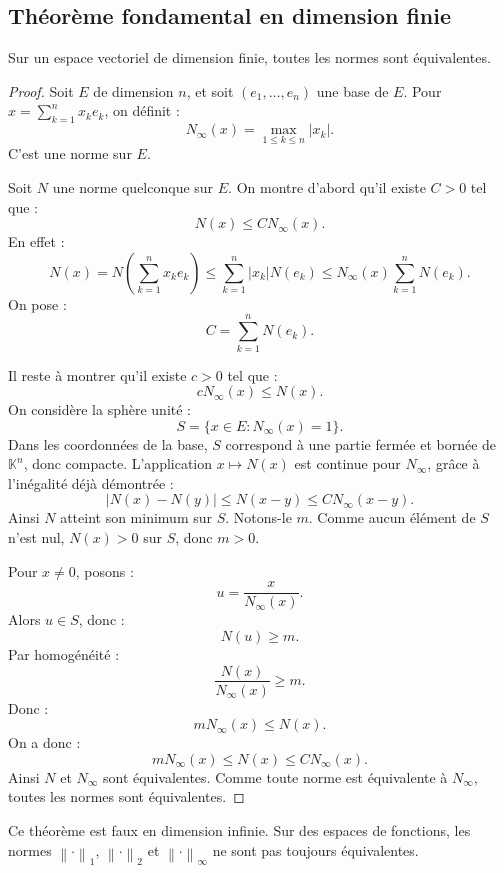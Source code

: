 \documentclass[11pt,a4paper]{article}
\newcommand{\K}{\mathbb K}
\newcommand{\norme}[1]{\left\lVert #1 \right\rVert}
\begin{document}
\subsection{Théorème fondamental en dimension finie}

\begin{theorembox}
Sur un espace vectoriel de dimension finie, toutes les normes sont équivalentes.
\end{theorembox}

\begin{proof}
Soit \(E\) de dimension \(n\), et soit \((e_1,\dots,e_n)\) une base de \(E\).  
Pour \(x=\sum_{k=1}^n x_ke_k\), on définit :
\[
N_\infty(x)=\max_{1\leq k\leq n}|x_k|.
\]
C'est une norme sur \(E\).

Soit \(N\) une norme quelconque sur \(E\). On montre d'abord qu'il existe \(C>0\) tel que :
\[
N(x)\leq C N_\infty(x).
\]
En effet :
\[
N(x)
=N\left(\sum_{k=1}^n x_ke_k\right)
\leq \sum_{k=1}^n |x_k|N(e_k)
\leq N_\infty(x)\sum_{k=1}^n N(e_k).
\]
On pose :
\[
C=\sum_{k=1}^n N(e_k).
\]

Il reste à montrer qu'il existe \(c>0\) tel que :
\[
cN_\infty(x)\leq N(x).
\]
On considère la sphère unité :
\[
S=\{x\in E: N_\infty(x)=1\}.
\]
Dans les coordonnées de la base, \(S\) correspond à une partie fermée et bornée de \(\K^n\), donc compacte.  
L'application \(x\mapsto N(x)\) est continue pour \(N_\infty\), grâce à l'inégalité déjà démontrée :
\[
|N(x)-N(y)|\leq N(x-y)\leq C N_\infty(x-y).
\]
Ainsi \(N\) atteint son minimum sur \(S\). Notons-le \(m\).  
Comme aucun élément de \(S\) n'est nul, \(N(x)>0\) sur \(S\), donc \(m>0\).

Pour \(x\neq0\), posons :
\[
u=\frac{x}{N_\infty(x)}.
\]
Alors \(u\in S\), donc :
\[
N(u)\geq m.
\]
Par homogénéité :
\[
\frac{N(x)}{N_\infty(x)}\geq m.
\]
Donc :
\[
mN_\infty(x)\leq N(x).
\]
On a donc :
\[
mN_\infty(x)\leq N(x)\leq CN_\infty(x).
\]
Ainsi \(N\) et \(N_\infty\) sont équivalentes. Comme toute norme est équivalente à \(N_\infty\), toutes les normes sont équivalentes.
\end{proof}

\begin{erreurbox}
Ce théorème est faux en dimension infinie.  
Sur des espaces de fonctions, les normes \(\norme{\cdot}_1\), \(\norme{\cdot}_2\) et \(\norme{\cdot}_\infty\) ne sont pas toujours équivalentes.
\end{erreurbox}

\end{document}
